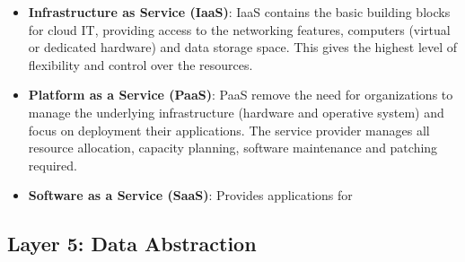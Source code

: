 \begin{itemize}
    \item \textbf{Infrastructure as Service (IaaS)}: IaaS contains the basic building blocks for cloud IT, providing access to the networking features, computers (virtual or dedicated hardware) and data storage space. This gives the highest level of flexibility and control over the resources.
    \item \textbf{Platform as a Service (PaaS)}: PaaS remove the need for organizations to manage the underlying infrastructure (hardware and operative system) and focus on deployment their applications. The service provider manages all resource allocation, capacity planning, software maintenance and patching required.
    \item \textbf{Software as a Service (SaaS)}: Provides applications for 
\end{itemize}

\subsection{Layer 5: Data Abstraction}
\label{sec:iot-model-layer5}



